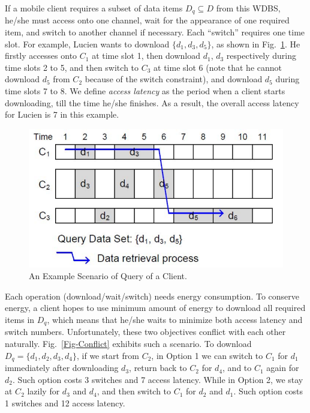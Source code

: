 \documentclass[12pt,a4paper]{article}
\theoremstyle{definition}
\begin{document}
\begin{enumerate}
If a mobile client requires a subset of data items $D_q \subseteq D$ from this WDBS, he/she must access onto one channel, wait for the appearance of one required item, and switch to another channel if necessary. Each ``switch'' requires one time slot. For example, Lucien wants to download $\{d_1, d_3, d_5\}$, as shown in Fig.~\ref{Fig-Access}. He firstly accesses onto $C_1$ at time slot 1, then download $d_1$, $d_3$ respectively during time slots 2 to 5, and then switch to $C_3$ at time slot 6 (note that he cannot download $d_5$ from $C_2$ because of the switch constraint), and download $d_5$ during time slots 7 to 8. We define \emph{access latency} as the period when a client starts downloading, till the time he/she finishes. As a result, the overall access latency for Lucien is 7 in this example.

\begin{figure}[!htbp]
	\centering
	\includegraphics[scale= 0.5]{Fig-Access.pdf}
	\caption{An Example Scenario of Query of a Client.} \label{Fig-Access}
\end{figure}

Each operation (download/wait/switch) needs energy consumption. To conserve energy, a client hopes to use minimum amount of energy to download all required items in $D_q$, which means that he/she waits to minimize both access latency and switch numbers. Unfortunately, these two objectives conflict with each other naturally. Fig.~\ref{Fig-Conflict} exhibits such a scenario. To download $D_q=\{d_1, d_2, d_3, d_4\}$, if we start from $C_2$, in Option 1 we can switch to $C_1$ for $d_1$ immediately after downloading $d_3$, return back to $C_2$ for $d_4$, and to $C_1$ again for $d_2$. Such option costs 3 switches and 7 access latency. While in Option 2, we stay at $C_2$ lazily for $d_3$ and $d_4$, and then switch to $C_1$ for $d_2$ and $d_1$. Such option costs 1 switches and 12 access latency.
\clearpage


\end{enumerate}
\end{document}
